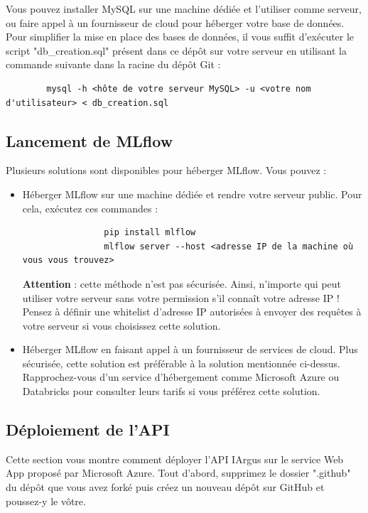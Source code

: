 \documentclass[french]{article}
\begin{document}
    Vous pouvez installer MySQL sur une machine dédiée et l'utiliser comme serveur, ou faire appel à un fournisseur de cloud pour héberger votre base de données. Pour simplifier la mise en place des bases de données, il vous suffit d'exécuter le script "db\_creation.sql" présent dans ce dépôt sur votre serveur en utilisant la commande suivante dans la racine du dépôt Git :
    \begin{verbatim}
        mysql -h <hôte de votre serveur MySQL> -u <votre nom d'utilisateur> < db_creation.sql
    \end{verbatim}

    \subsection{Lancement de MLflow}

    Plusieurs solutions sont disponibles pour héberger MLflow. Vous pouvez :
    \begin{itemize}
        \item Héberger MLflow sur une machine dédiée et rendre votre serveur public. Pour cela, exécutez ces commandes :
            \begin{verbatim}
                pip install mlflow
                mlflow server --host <adresse IP de la machine où vous vous trouvez> 
            \end{verbatim}
            \textbf{Attention} : cette méthode n'est pas sécurisée. Ainsi, n'importe qui peut utiliser votre serveur sans votre permission s'il connaît votre adresse IP ! Pensez à définir une whitelist d'adresse IP autorisées à envoyer des requêtes à votre serveur si vous choisissez cette solution.
        \item Héberger MLflow en faisant appel à un fournisseur de services de cloud. Plus sécurisée, cette solution est préférable à la solution mentionnée ci-dessus. Rapprochez-vous d'un service d'hébergement comme Microsoft Azure ou Databricks pour consulter leurs tarifs si vous préférez cette solution.
    \end{itemize}

    \subsection{Déploiement de l'API}

    Cette section vous montre comment déployer l'API IArgus sur le service Web App proposé par Microsoft Azure. Tout d'abord, supprimez le dossier ".github" du dépôt que vous avez forké puis créez un nouveau dépôt sur GitHub et poussez-y le vôtre.
\end{document}
